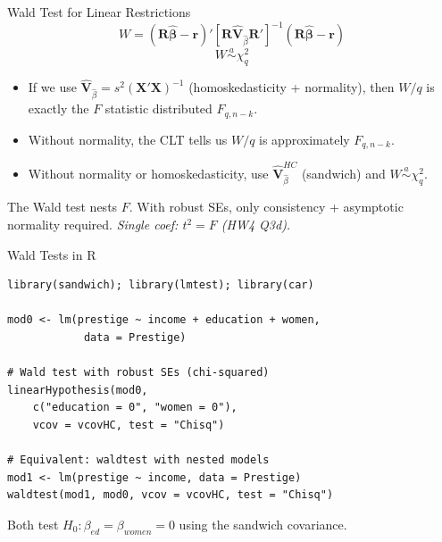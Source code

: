 \documentclass[aspectratio=169, handout, t]{beamer}
\numberwithin{equation}{section}
\begin{document}

\begin{frame}{Wald Test for Linear Restrictions}
$$W=(\bm{R}\hat{\bm{\beta}}-\bm{r})'[\bm{R}\hat{\bm{V}}_{\hat{\beta}}\bm{R}']^{-1}(\bm{R}\hat{\bm{\beta}}-\bm{r})$$
$$W \overset{a}{\sim} \chi^2_q$$
\begin{itemize}
\item If we use $\hat{\bm{V}}_{\hat{\beta}} = s^2(\bm{X}'\bm{X})^{-1}$ (homoskedasticity + normality), then $W/q$ is exactly the $F$ statistic distributed $F_{q,n-k}$.
\item Without normality, the CLT tells us $W/q$ is approximately $F_{q,n-k}$.
\item Without normality or homoskedasticity, use $\hat{\bm{V}}_{\hat{\beta}}^{HC}$ (sandwich) and $W \overset{a}{\sim} \chi^2_q$.
\end{itemize}

\pause

\begin{tcolorbox}[colback=blue!5, colframe=blue!50]
The Wald test nests $F$. With robust SEs, only consistency + asymptotic normality required. \textit{Single coef: $t^2 = F$ (HW4 Q3d).}
\end{tcolorbox}

\end{frame}


\begin{frame}[fragile]{Wald Tests in R}
  \begin{lstlisting}
library(sandwich); library(lmtest); library(car)

mod0 <- lm(prestige ~ income + education + women,
            data = Prestige)

# Wald test with robust SEs (chi-squared)
linearHypothesis(mod0,
    c("education = 0", "women = 0"),
    vcov = vcovHC, test = "Chisq")

# Equivalent: waldtest with nested models
mod1 <- lm(prestige ~ income, data = Prestige)
waldtest(mod1, mod0, vcov = vcovHC, test = "Chisq")
\end{lstlisting}

\pause

Both test $H_0: \beta_{ed} = \beta_{women} = 0$ using the sandwich covariance.

\end{frame}

\end{document}

